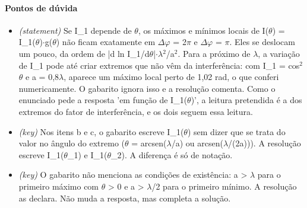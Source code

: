 \documentclass{article}%
\begin{document}
\paragraph{Pontos de dúvida}%
\begin{itemize}%
\item%
\textit{(statement)} Se I\_1 depende de $\theta$, os máximos e mínimos locais de I($\theta$) = I\_1($\theta$)$\cdot$g($\theta$) não ficam exatamente em $\Delta$$\varphi$ = 2$\pi$ e $\Delta$$\varphi$ = $\pi$. Eles se deslocam um pouco, da ordem de |d ln I\_1/d$\theta$|$\cdot$$\lambda$$^2$/a$^2$. Para a próximo de $\lambda$, a variação de I\_1 pode até criar extremos que não vêm da interferência: com I\_1 = cos$^2$$\theta$ e a = 0,8$\lambda$, aparece um máximo local perto de 1,02 rad, o que conferi numericamente. O gabarito ignora isso e a resolução comenta. Como o enunciado pede a resposta 'em função de I\_1($\theta$)', a leitura pretendida é a dos extremos do fator de interferência, e os dois seguem essa leitura.%
\item%
\textit{(key)} Nos itens b e c, o gabarito escreve I\_1($\theta$) sem dizer que se trata do valor no ângulo do extremo ($\theta$ = arcsen($\lambda$/a) ou arcsen($\lambda$/(2a))). A resolução escreve I\_1($\theta$\_1) e I\_1($\theta$\_2). A diferença é só de notação.%
\item%
\textit{(key)} O gabarito não menciona as condições de existência: a > $\lambda$ para o primeiro máximo com $\theta$ > 0 e a > $\lambda$/2 para o primeiro mínimo. A resolução as declara. Não muda a resposta, mas completa a solução.%
\end{itemize}%
\end{document}
